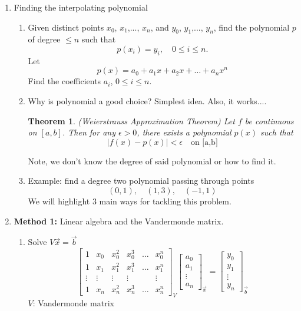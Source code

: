 \documentclass{article}
\newtheorem{thm}{Theorem}[section]
\theoremstyle{remark}
\begin{document}
\begin{enumerate}
\item Finding the interpolating polynomial
\begin{enumerate}
\item Given distinct points $x_0$, $x_1$,..., $x_n$, and $y_0$, $y_1$,..., $y_n$, find the polynomial $p$ of degree $\leq n$ such that 
$$
p(x_i) = y_i,\quad 0\leq i\leq n.
$$
Let
$$
p(x) = a_0 + a_1x + a_2x + \dots + a_nx^n
$$
Find the coefficients $a_i$, $0\leq i\leq n$.
\item Why is polynomial a good choice? Simplest idea. Also, it works....
\begin{thm}
(Weierstrauss Approximation Theorem)
Let $f$ be continuous on $[a,b]$. Then for any $\epsilon >0 $, there exists a polynomial $p(x)$ such that 
\[
|f(x) - p(x)| < \epsilon \quad \text{on [a,b]}
\]
\end{thm}
Note, we don't know the degree of said polynomial or how to find it.
\item Example: find a degree two polynomial passing through points
$$
(0,1), \quad (1,3),\quad (-1,1)
$$
We will highlight 3 main ways for tackling this problem.
\end{enumerate}


\item {\bf Method 1:} Linear algebra and the Vandermonde matrix.
\begin{enumerate}
\item Solve $V\vec x = \vec b$
$$
\begin{bmatrix}
1 & x_0 & x_0^2 & x_0^3 & \dots& x_0^n\\
1 & x_1 & x_1^2 & x_1^3 &\dots & x_1^n\\
 \vdots&\vdots&\vdots&\vdots &&\vdots\\
1 & x_n & x_n^2 & x_n^3 &\dots & x_n^n
\end{bmatrix}_V
\begin{bmatrix}
a_0\\
a_1\\
\vdots\\
a_n
\end{bmatrix}_{\vec x} = \begin{bmatrix}
y_0\\
y_1\\
\vdots\\
y_n
\end{bmatrix}_{\vec b}
$$
$V$: Vandermonde matrix 


\end{enumerate}
\end{enumerate}
\end{document}
